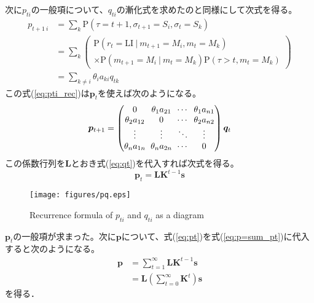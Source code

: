 \documentclass{jarticle}
\numberwithin{equation}{section}
\numberwithin{table}{section}
\theoremstyle{plain}
\begin{document}
次に$ p_{t i} $の一般項について、$ q_{t i} $の漸化式を求めたのと同様にして次式を得る。
\begin{align}
    p_{t+1\ i} & = \! \sum_{k} \mathrm{P}(\tau = t + 1 , \sigma_{t+1} = S_i , \sigma_t = S_k) \nonumber\\
    & = \! \sum_{k} \left(
        \begin{array}{l}
            \mathrm{P}(r_t = \mathrm{LI}\ |\ m_{t+1} \! = \! M_i , m_t \! = \! M_k) \\
            \times \mathrm{P}(m_{t+1} \! = \! M_i\ |\ m_t \! = \! M_k) \mathrm{P}(\tau \! > \! t , m_t \! = \! M_k)
        \end{array}
    \right) \nonumber\\
    & = \! \sum_{k \ne i} \theta_i a_{k i} q_{t k}
    \label{eq:pti_rec}
\end{align}
この式(\ref{eq:pti_rec})は$ \bm{p}_t $を使えば次のようになる。
\begin{equation}
    \arraycolsep3pt
    \bm{p}_{t + 1} = 
    \begin{pmatrix}
        0 & \theta_1 a_{2 1} & \cdots & \theta_1 a_{n 1} \\
        \theta_2 a_{1 2} & 0 & \cdots & \theta_2 a_{n 2} \\
        \vdots & \vdots & \ddots & \vdots \\
        \theta_n a_{1 n} & \theta_n a_{2 n} & \cdots & 0 \\
    \end{pmatrix}
    \bm{q}_t
\end{equation}
この係数行列を$ \bm{L} $とおき式(\ref{eq:qt})を代入すれば次式を得る。
\begin{equation} \label{eq:pt}
    \bm{p}_t = \bm{L} \bm{K}^{t - 1} \bm{s}
\end{equation}

\begin{figure}[bt]
    \centering
    \texttt{[image: figures/pq.eps]}
    \caption{Recurrence formula of $ p_{t i} $ and $ q_{t i} $ as a diagram}
\end{figure}

$ \bm{p}_t $の一般項が求まった。次に$ \bm{p} $について、式(\ref{eq:pt})を式(\ref{eq:p=sum_pt})に代入すると次のようになる。
\begin{align}
    \bm{p} &= \sum_{t=1}^{\infty} \bm{L} \bm{K}^{t - 1} \bm{s} \nonumber \\
    &= \bm{L} \left( \sum_{t=0}^{\infty} \bm{K}^t \right) \bm{s} \label{eq:p_}
\end{align}
を得る．
\end{document}
